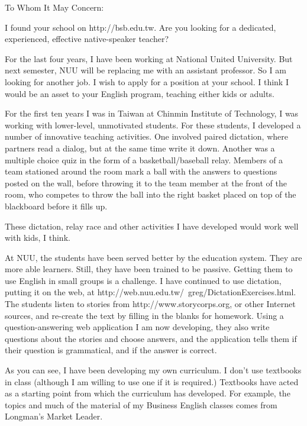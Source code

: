 \documentclass{letter}
\begin{document}
\begin{letter}{
}
\opening{To Whom It May Concern:}



I found your school on http://bsb.edu.tw. Are you looking for a dedicated, experienced, effective native-speaker teacher?

For the last four years, I have been working at National United University. But next semester, NUU will be replacing me with an assistant professor. So I am looking for another job. I wish to apply for a position at your school. I think I would be an asset to your English program, teaching either kids or adults.

For the first ten years I was in Taiwan at Chinmin Institute of Technology, I was working with lower-level, unmotivated students. For these students, I developed a number of innovative teaching activities. One involved paired dictation, where partners read a dialog, but at the same time write it down. Another was a multiple choice quiz in the form of a basketball/baseball relay. Members of a team stationed around the room mark a ball with the answers to questions posted on the wall, before throwing it to the team member at the front of the room, who competes to throw the ball into the right basket placed on top of the blackboard before it fills up.

These dictation, relay race and other activities I have developed would work well with kids, I think.

At NUU, the students have been served better by the education system. They are more able learners. Still, they have been trained to be passive. Getting them to use English in small groups is a challenge. I have continued to use dictation, putting it on the web, at http://web.nuu.edu.tw/~greg/DictationExercises.html. The students listen to stories from http://www.storycorps.org, or other Internet sources, and re-create the text by filling in the blanks for homework. Using a question-answering web application I am now developing, they also write questions about the stories and choose answers, and the application tells them if their question is grammatical, and if the answer is correct.

As you can see, I have been developing my own curriculum. I don't use textbooks in class (although I am willing to use one if it is required.) Textbooks have acted as a starting point from which the curriculum has developed. For example, the topics and much of the material of my Business English classes comes from Longman's Market Leader.
 

\end{letter}
\end{document}

